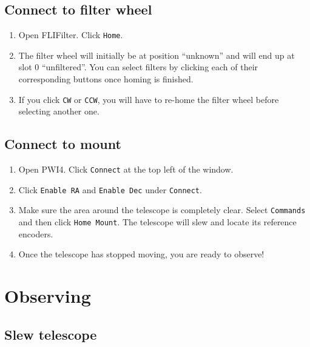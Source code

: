 \documentclass{article}
\begin{document}
	\subsection{Connect to filter wheel}
	\label{sec:connect-to-filter-wheel}
	
	\begin{enumerate}
		
		\item Open FLIFilter. Click \texttt{Home}.
		
		\item The filter wheel will initially be at position ``unknown'' and will end up at slot 0 ``unfiltered''. You can select filters by clicking each of their corresponding buttons once homing is finished.
		
		\item If you click \texttt{CW} or \texttt{CCW}, you will have to re-home the filter wheel before selecting another one.
		
	\end{enumerate}
	
	\subsection{Connect to mount}
	\label{sec:connect-to-mount}
	
	\begin{enumerate}
		
		\item Open PWI4. Click \texttt{Connect} at the top left of the window.
		
		\item Click \texttt{Enable RA} and \texttt{Enable Dec} under \texttt{Connect}.
		
		\item Make sure the area around the telescope is completely clear. Select \texttt{Commands} and then click \texttt{Home Mount}. The telescope will slew and locate its reference encoders.
		
		\item Once the telescope has stopped moving, you are ready to observe!
		
	\end{enumerate}
	
	\newpage
	\section{Observing}
	\label{sec:observing}
	
	\subsection{Slew telescope}
	\label{sec:slew-telescope}
	
\end{document}
